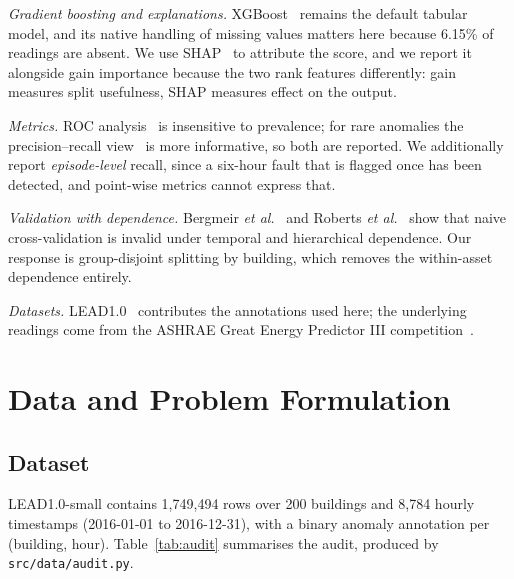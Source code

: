 \documentclass[conference]{IEEEtran}
\begin{document}
\emph{Gradient boosting and explanations.} XGBoost~\cite{chen2016} remains the default tabular model,
and its native handling of missing values matters here because 6.15\% of readings are absent. We use
SHAP~\cite{lundberg2017} to attribute the score, and we report it alongside gain importance because the
two rank features differently: gain measures split usefulness, SHAP measures effect on the output.

\emph{Metrics.} ROC analysis~\cite{fawcett2006} is insensitive to prevalence; for rare anomalies the
precision--recall view~\cite{saito2015} is more informative, so both are reported. We additionally
report \emph{episode-level} recall, since a six-hour fault that is flagged once has been detected, and
point-wise metrics cannot express that.

\emph{Validation with dependence.} Bergmeir \emph{et al.}~\cite{bergmeir2018} and
Roberts \emph{et al.}~\cite{roberts2017} show that naive cross-validation is invalid under temporal and
hierarchical dependence. Our response is group-disjoint splitting by building, which removes the
within-asset dependence entirely.

\emph{Datasets.} LEAD1.0~\cite{gulati2022} contributes the annotations used here; the underlying
readings come from the ASHRAE Great Energy Predictor III competition~\cite{miller2020}.

\section{Data and Problem Formulation}
\label{sec:data}

\subsection{Dataset}

LEAD1.0-small contains 1{,}749{,}494 rows over 200 buildings and 8{,}784 hourly timestamps
(2016-01-01 to 2016-12-31), with a binary anomaly annotation per (building, hour). Table~\ref{tab:audit}
summarises the audit, produced by \texttt{src/data/audit.py}.
\end{document}
